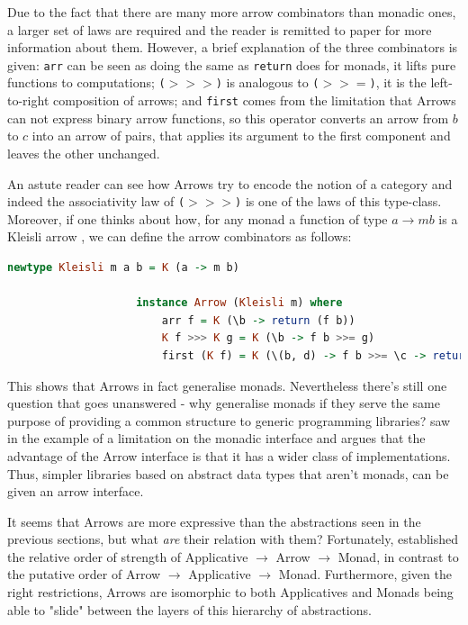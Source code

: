 \documentclass[
  oneside,
  11pt, a4paper,
  footinclude=true,
  headinclude=true,
  cleardoublepage=empty
]{scrbook}
\theoremstyle{definition}
\theoremstyle{definition}
\begin{document}
    Due to the fact that there are many more arrow combinators than monadic ones, a larger set of laws are required and the reader is remitted to \cite{Hughes:2000:GMA:347238.347246} paper for more information about them. However, a brief explanation of the three combinators is given: \texttt{arr} can be seen as doing the same as \texttt{return} does for monads, it lifts pure functions to computations; \texttt{($>>>$)} is analogous to \texttt{($>>=$)}, it is the left-to-right composition of arrows; and \texttt{first} comes from the limitation that Arrows can not express binary arrow functions, so this operator converts an arrow from $b$ to $c$ into an arrow of pairs, that applies its argument to the first component and leaves the other unchanged.
    	       
    An astute reader can see how Arrows try to encode the notion of a category and indeed the associativity law of \texttt{($>>>$)} is one of the laws of this type-class. Moreover, if one thinks about how, for any monad a function of type $a \rightarrow m b$ is a Kleisli arrow \citep{Awodey:2010:CT:2060081}, we can define the arrow combinators as follows:
    	        
                \begin{lstlisting}[mathescape, language=Haskell, caption={Arrow Kleisli type-class instance},captionpos=b]
                    newtype Kleisli m a b = K (a -> m b)
                
                    instance Arrow (Kleisli m) where
                        arr f = K (\b -> return (f b))
                        K f >>> K g = K (\b -> f b >>= g)
                        first (K f) = K (\(b, d) -> f b >>= \c -> return (c, d))
                \end{lstlisting}{}
                
    This shows that Arrows in fact generalise monads. Nevertheless there's still one question that goes unanswered - why generalise monads if they serve the same purpose of providing a common structure to generic programming libraries? \cite{Hughes:2000:GMA:347238.347246} saw in the example of \cite{swiestra&duponcheel} a limitation on the monadic interface and argues that the advantage of the Arrow interface is that it has a wider class of implementations. Thus, simpler libraries based on abstract data types that aren't monads, can be given an arrow interface.
                
    It seems that Arrows are more expressive than the abstractions seen in the previous sections, but what \emph{are} their relation with them? Fortunately, \cite{Lindley:2011:IOA:1953652.1954016} established the relative order of strength of Applicative $\rightarrow$ Arrow $\rightarrow$ Monad, in contrast to the putative order of Arrow $\rightarrow$ Applicative $\rightarrow$ Monad. Furthermore, given the right restrictions, Arrows are isomorphic to both Applicatives and Monads being able to "slide" between the layers of this hierarchy of abstractions.
    	        
\end{document}
